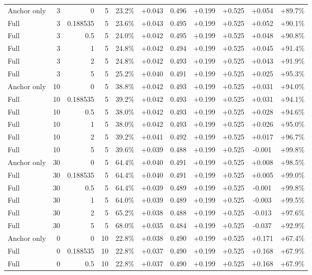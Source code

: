 \begin{table}[htbp]
\begin{tabular}{lrrrccccccc}
Anchor only & 3 & 0 & 5 & 23.2\% & +0.043 & 0.496 & +0.199 & +0.525 & +0.054 & +89.7\% \\
Full & 3 & 0.188535 & 5 & 23.6\% & +0.043 & 0.495 & +0.199 & +0.525 & +0.052 & +90.1\% \\
Full & 3 & 0.5 & 5 & 24.0\% & +0.042 & 0.495 & +0.199 & +0.525 & +0.048 & +90.8\% \\
Full & 3 & 1 & 5 & 24.8\% & +0.042 & 0.494 & +0.199 & +0.525 & +0.045 & +91.4\% \\
Full & 3 & 2 & 5 & 24.8\% & +0.042 & 0.493 & +0.199 & +0.525 & +0.043 & +91.9\% \\
Full & 3 & 5 & 5 & 25.2\% & +0.040 & 0.491 & +0.199 & +0.525 & +0.025 & +95.3\% \\
Anchor only & 10 & 0 & 5 & 38.8\% & +0.042 & 0.493 & +0.199 & +0.525 & +0.031 & +94.0\% \\
Full & 10 & 0.188535 & 5 & 39.2\% & +0.042 & 0.493 & +0.199 & +0.525 & +0.031 & +94.1\% \\
Full & 10 & 0.5 & 5 & 38.0\% & +0.042 & 0.493 & +0.199 & +0.525 & +0.028 & +94.6\% \\
Full & 10 & 1 & 5 & 38.0\% & +0.042 & 0.493 & +0.199 & +0.525 & +0.026 & +95.0\% \\
Full & 10 & 2 & 5 & 39.2\% & +0.041 & 0.492 & +0.199 & +0.525 & +0.017 & +96.7\% \\
Full & 10 & 5 & 5 & 39.6\% & +0.039 & 0.488 & +0.199 & +0.525 & -0.001 & +99.8\% \\
Anchor only & 30 & 0 & 5 & 64.4\% & +0.040 & 0.491 & +0.199 & +0.525 & +0.008 & +98.5\% \\
Full & 30 & 0.188535 & 5 & 64.4\% & +0.040 & 0.491 & +0.199 & +0.525 & +0.005 & +99.0\% \\
Full & 30 & 0.5 & 5 & 64.4\% & +0.039 & 0.489 & +0.199 & +0.525 & -0.001 & +99.8\% \\
Full & 30 & 1 & 5 & 64.0\% & +0.039 & 0.489 & +0.199 & +0.525 & -0.003 & +99.5\% \\
Full & 30 & 2 & 5 & 65.2\% & +0.038 & 0.488 & +0.199 & +0.525 & -0.013 & +97.6\% \\
Full & 30 & 5 & 5 & 68.0\% & +0.035 & 0.484 & +0.199 & +0.525 & -0.037 & +92.9\% \\
Anchor only & 0 & 0 & 10 & 22.8\% & +0.038 & 0.490 & +0.199 & +0.525 & +0.171 & +67.4\% \\
Full & 0 & 0.188535 & 10 & 22.8\% & +0.037 & 0.490 & +0.199 & +0.525 & +0.168 & +67.9\% \\
Full & 0 & 0.5 & 10 & 22.8\% & +0.037 & 0.490 & +0.199 & +0.525 & +0.168 & +67.9\% \\

\end{tabular}
\end{table}
